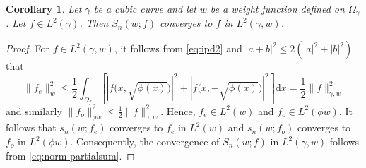 \documentclass{amsart}
\newtheorem{cor}[thm]{Corollary}
\theoremstyle{remark}
\def\d{\mathrm{d}}
\def\g{{\gamma}}
\begin{document}
\begin{cor}
Let $\g$ be a cubic curve and let $w$ be a weight function defined on $\Omega_\g$. Let $f \in 
L^2(\g)$. Then $S_n(w; f)$ converges to $f$ in $L^2(\g,w)$. 
\end{cor}

\begin{proof}
For $f\in L^2(\g,w)$, it follows from \eqref{eq:ipd2} and $|a+b|^2 \le 2 (|a|^2+|b|^2)$ that 
$$
  \|f_e\|_w^2 \le \frac12 \int_{\Omega_f} \left[|f\big (x,\sqrt{\phi(x)} \big)|^2 + |f\big (x,- \sqrt{\phi(x)} \big)|^2\right]\d x
     = \frac12 \|f\|_{\g,w}^2
$$
and similarly $\|f_o\|_{\phi w}^2 \le  \frac12 \|f\|_{\g,w}^2$. Hence, $f_e \in L^2(w)$ and $f_o \in L^2(\phi w)$. 
It follows that $s_n(w; f_e)$ converges to $f_e$ in $L^2(w)$ and $s_n(w; f_o)$ converges to 
$f_o$ in $L^2(\phi w)$. Consequently, the convergence of $S_n(w; f)$ in $L^2(\g,w)$ follows from 
\eqref{eq:norm-partialsum}.
\end{proof}
\end{document}
